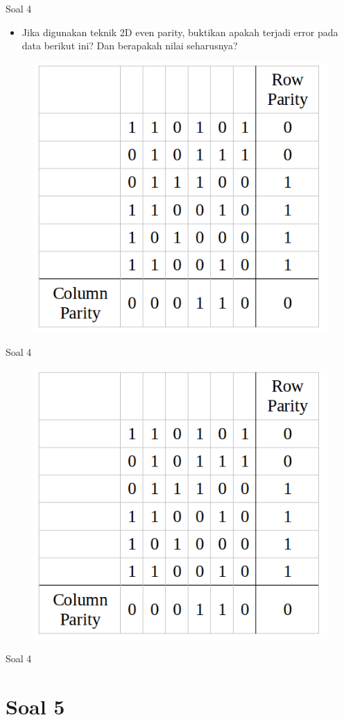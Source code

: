\documentclass[aspectratio=169]{beamer}
\begin{document}
\begin{frame}[t]{Soal 4}
	\begin{itemize}
		\item Jika digunakan teknik 2D even parity, buktikan apakah terjadi error pada data berikut ini? Dan berapakah nilai seharusnya?
	\end{itemize}

	\begin{figure}
		\centering
		\includegraphics[width=0.4\linewidth]{../../../soal/kuis/soal4_kuis2}
	\end{figure}
\end{frame}

\begin{frame}[t]{Soal 4}
	\begin{figure}
		\centering
		\includegraphics[width=0.5\linewidth]{../../../soal/kuis/soal4_kuis2}
	\end{figure}
\end{frame}

\begin{frame}[t]{Soal 4}
	
\end{frame}

\section{Soal 5}
\end{document}
